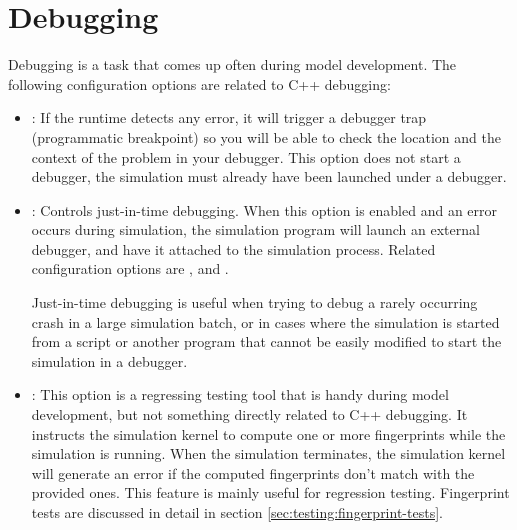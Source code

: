  
\section{Debugging}
\label{sec:run-sim:debugging-support}

Debugging is a task that comes up often during model development. The following
configuration options are related to C++ debugging:

\begin{itemize}
  \item {} : If the runtime detects any error, it will
        trigger a debugger trap (programmatic breakpoint) so you will be able
        to check the location and the context of the problem in your debugger.
        This option does not start a debugger, the simulation must already
        have been launched under a debugger.

  \item {} : Controls just-in-time debugging.
        When this option is enabled and an error occurs during simulation, the
        simulation program will launch an external debugger, and have it
        attached to the simulation process. Related configuration options are
        , 
        and .

        \begin{hint}
        Just-in-time debugging is useful when trying to debug a rarely occurring
        crash in a large simulation batch, or in cases where the simulation is
        started from a script or another program that cannot be easily modified
        to start the simulation in a debugger.
        \end{hint}

  \item {} : This option is a regressing testing tool that
        is handy during model development, but not something directly related to
        C++ debugging. It instructs the simulation kernel to compute one or more
        fingerprints while the simulation is running. When the simulation
        terminates, the simulation kernel will generate an error if the computed
        fingerprints don't match with the provided ones. This  feature is mainly
        useful for regression testing. Fingerprint tests are discussed in detail
        in section  \ref{sec:testing:fingerprint-tests}. 

\end{itemize}

